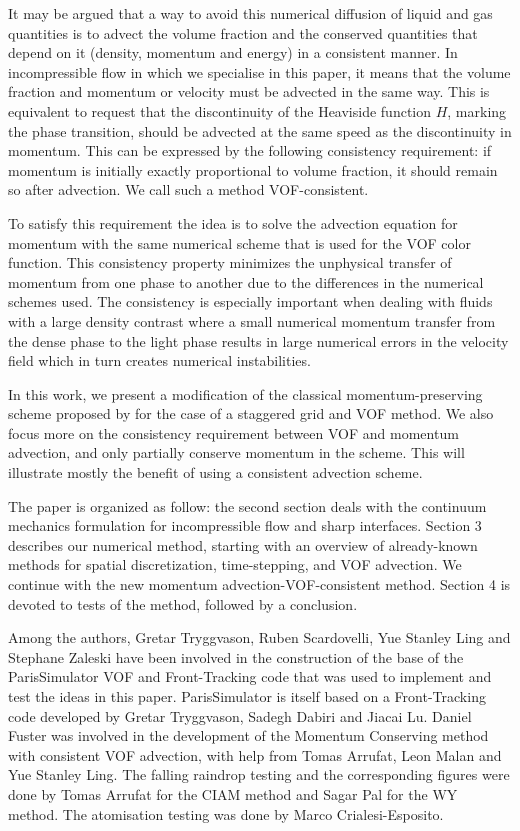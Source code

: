 It may be argued that a way to avoid this numerical diffusion of liquid and gas quantities is to advect 
the volume fraction and the conserved quantities that depend on it (density, momentum and energy) in a consistent manner.
In incompressible flow in which we specialise in this paper, it means that the volume fraction and momentum
or velocity must be advected in the same way. This is equivalent to request 
that the discontinuity of the Heaviside function $H$, marking the phase transition,
should be advected at the same speed as the discontinuity in momentum. 
This can be expressed by the following consistency requirement: 
if momentum is initially exactly proportional to volume fraction, 
it should remain so after advection. 
We call such a method VOF-consistent.

To satisfy this requirement the idea is to solve
the advection equation for momentum with the same numerical scheme that
is used for the VOF color function.
{This consistency property minimizes the unphysical transfer of momentum from one phase to another due to the differences in the numerical schemes used. The consistency is especially important
when dealing with fluids with a large density contrast where a small numerical momentum transfer from the dense phase to the light phase results in large numerical errors in the velocity field which in turn creates numerical instabilities.}

In this work, we present a modification of the classical 
momentum-preserving scheme proposed by \cite{rudman98}
for the case of a staggered grid and VOF method. We also focus more on 
the consistency requirement between VOF and momentum advection, and only 
partially conserve momentum in the scheme. This will illustrate mostly the benefit
of using a consistent advection scheme. 

The paper is organized as follow: the second section deals with the continuum mechanics formulation 
for incompressible flow and sharp interfaces. Section 3 describes our numerical method, starting
with an overview of already-known methods for spatial discretization, time-stepping, and VOF advection. We 
continue with the new momentum advection-VOF-consistent method. Section 4 is devoted to tests of the 
method, followed by a conclusion. 

Among the authors, Gretar Tryggvason, Ruben Scardovelli, Yue Stanley Ling and Stephane
Zaleski have been involved in the construction of the base of the
ParisSimulator VOF and Front-Tracking code that was used to implement
and test the ideas in this paper. ParisSimulator is itself based on a
Front-Tracking code developed by Gretar Tryggvason, Sadegh Dabiri and
Jiacai Lu.  Daniel Fuster was involved in the development of the
Momentum Conserving method with consistent VOF advection, with help
from Tomas Arrufat, Leon Malan and Yue Stanley Ling.  The falling
raindrop testing and the corresponding figures were done by Tomas
Arrufat for the CIAM method and Sagar Pal for the WY
method. The atomisation testing was done by Marco
Crialesi-Esposito. 
